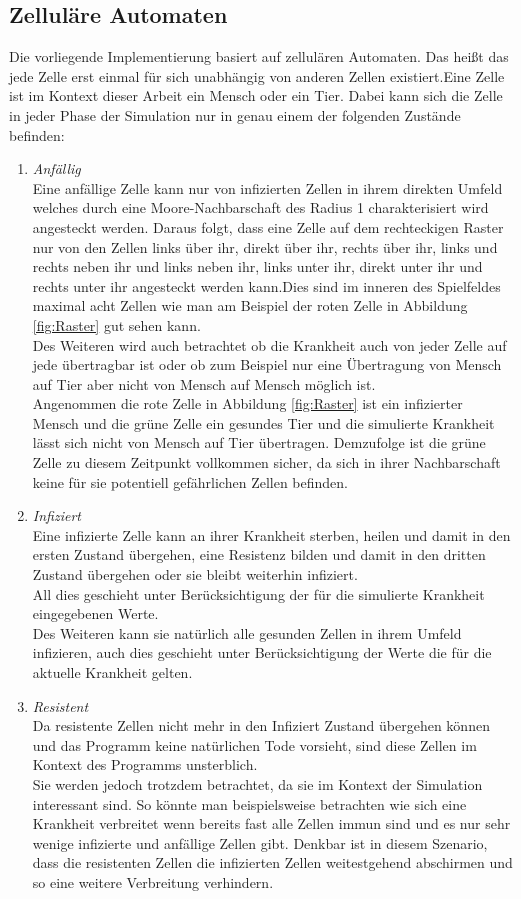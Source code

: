 \subsection*{Zelluläre Automaten}
Die vorliegende Implementierung basiert auf zellulären Automaten. Das heißt das jede Zelle erst einmal für sich unabhängig von anderen Zellen existiert.Eine Zelle ist im Kontext dieser Arbeit ein Mensch oder ein Tier. Dabei kann sich die Zelle in jeder Phase der Simulation nur in genau einem der folgenden Zustände befinden:
\begin{enumerate}
\item{\emph{Anfällig}\\
Eine anfällige Zelle kann nur von infizierten Zellen in ihrem direkten Umfeld welches durch eine Moore-Nachbarschaft \cite{Weisstein:2014} des Radius 1 charakterisiert wird angesteckt werden. Daraus folgt, dass eine Zelle auf dem rechteckigen Raster nur von den Zellen links über ihr, direkt über ihr, rechts über ihr, links und rechts neben ihr und links neben ihr, links unter ihr, direkt unter ihr und rechts unter ihr angesteckt werden kann.Dies sind im inneren des Spielfeldes maximal acht Zellen wie man am Beispiel der roten Zelle in Abbildung \ref{fig:Raster} gut sehen kann.\\
Des Weiteren wird auch betrachtet ob die Krankheit auch von jeder Zelle auf jede übertragbar ist oder ob zum Beispiel nur eine Übertragung von Mensch auf Tier aber nicht von Mensch auf Mensch möglich ist.\\
Angenommen die rote Zelle in Abbildung \ref{fig:Raster} ist ein infizierter Mensch und  die grüne Zelle ein gesundes Tier und die simulierte Krankheit lässt sich nicht von Mensch auf Tier übertragen. Demzufolge ist die grüne Zelle zu diesem Zeitpunkt vollkommen sicher, da sich in ihrer Nachbarschaft keine für sie potentiell gefährlichen Zellen befinden. 
}
\item{\emph{Infiziert}\\
Eine infizierte Zelle kann an ihrer Krankheit sterben, heilen und damit in den ersten Zustand übergehen, eine Resistenz bilden und damit in den dritten Zustand übergehen oder sie bleibt weiterhin infiziert.\\
All dies geschieht unter Berücksichtigung der für die simulierte Krankheit eingegebenen Werte.\\
Des Weiteren kann sie natürlich alle gesunden Zellen in ihrem Umfeld infizieren, auch dies geschieht unter Berücksichtigung der Werte die für die aktuelle Krankheit gelten.
}
\item{\emph{Resistent}\\
Da resistente Zellen nicht mehr in den Infiziert Zustand übergehen können und das Programm keine natürlichen Tode vorsieht, sind diese Zellen im Kontext des Programms unsterblich.\\
Sie werden jedoch trotzdem betrachtet, da sie im Kontext der Simulation interessant sind. So könnte man beispielsweise betrachten wie sich eine Krankheit verbreitet wenn bereits fast alle Zellen immun sind und es nur sehr wenige infizierte und anfällige Zellen gibt. Denkbar ist in diesem Szenario, dass die resistenten Zellen die infizierten Zellen weitestgehend abschirmen und so eine weitere Verbreitung verhindern. 
}


\end{enumerate}
